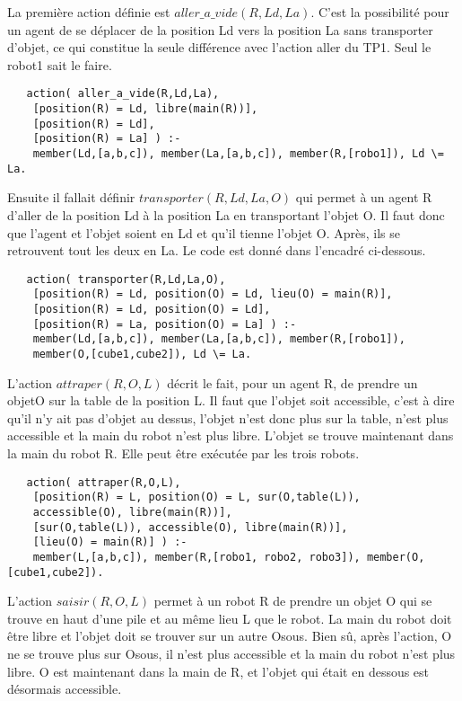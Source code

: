 \documentclass[a4paper,10pt]{article}
\begin{document}
   La premi\`{e}re action d\'{e}finie est $aller\_a\_vide(R,Ld,La)$. C'est la possibilit\'{e} pour un agent de se d\'{e}placer de la position Ld vers la position La sans 
   transporter d'objet, ce qui constitue la seule diff\'{e}rence avec l'action aller du TP1. Seul le robot1 sait le faire.
   \begin{lstlisting}
   action( aller_a_vide(R,Ld,La),
	[position(R) = Ld, libre(main(R))],
	[position(R) = Ld],
	[position(R) = La] ) :-
	member(Ld,[a,b,c]), member(La,[a,b,c]), member(R,[robo1]), Ld \= La.
   \end{lstlisting}
   Ensuite il fallait d\'{e}finir $transporter(R,Ld,La,O)$ qui permet \`{a} un agent R d'aller de la position Ld \`{a} la position La en transportant l'objet O.
   Il faut donc que l'agent et l'objet soient en Ld et qu'il tienne l'objet O. Apr\`{e}s, ils se retrouvent tout les deux en La. Le code est donn\'{e} dans l'encadré ci-dessous.
   \begin{lstlisting}
   action( transporter(R,Ld,La,O),
	[position(R) = Ld, position(O) = Ld, lieu(O) = main(R)],
	[position(R) = Ld, position(O) = Ld],
	[position(R) = La, position(O) = La] ) :-
	member(Ld,[a,b,c]), member(La,[a,b,c]), member(R,[robo1]), 
	member(O,[cube1,cube2]), Ld \= La.
   \end{lstlisting}
   L'action $attraper(R,O,L)$ d\'{e}crit le fait, pour un agent R, de prendre un objetO sur la table de la position L. Il faut que l'objet soit accessible, c'est \`{a} dire qu'il n'y ait pas d'objet au dessus,
   l'objet n'est donc plus sur la table, n'est plus accessible et la main du robot n'est plus libre. L'objet se trouve maintenant dans la main du robot R.
   Elle peut \^{e}tre ex\'{e}cut\'{e}e par les trois robots.
   \begin{lstlisting}
   action( attraper(R,O,L),
	[position(R) = L, position(O) = L, sur(O,table(L)), 
	accessible(O), libre(main(R))],
	[sur(O,table(L)), accessible(O), libre(main(R))],
	[lieu(O) = main(R)] ) :-
	member(L,[a,b,c]), member(R,[robo1, robo2, robo3]), member(O,[cube1,cube2]).
   \end{lstlisting}
   L'action $saisir(R,O,L)$ permet \`{a} un robot R de prendre un objet O qui se trouve en haut d'une pile et au m\^{e}me lieu L que le robot.
   La main du robot doit être libre et l'objet doit se trouver sur un autre Osous. Bien s\^{u}, apr\`{e}s l'action, O ne se trouve plus sur Osous,
   il n'est plus accessible et la main du robot n'est plus libre. O est maintenant dans la main de R, et l'objet qui \'{e}tait en dessous est d\'{e}sormais accessible.
\end{document}
